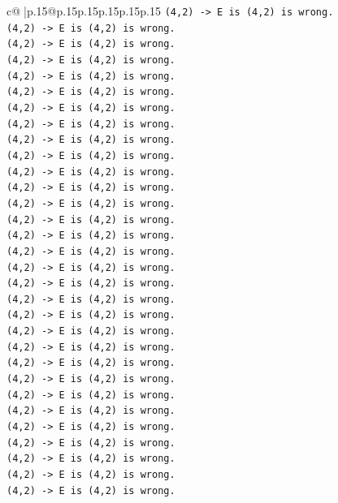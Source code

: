 \documentclass{article}
\begin{document}
{\begin{supertabular}{c@{$\;$}|p{.15\linewidth}@{}p{.15\linewidth}p{.15\linewidth}p{.15\linewidth}p{.15\linewidth}p{.15\linewidth}}
{{{\texttt{(4,2) {-}> E is (4,2) is wrong.} \\
\texttt{(4,2) {-}> E is (4,2) is wrong.} \\
\texttt{(4,2) {-}> E is (4,2) is wrong.} \\
\texttt{(4,2) {-}> E is (4,2) is wrong.} \\
\texttt{(4,2) {-}> E is (4,2) is wrong.} \\
\texttt{(4,2) {-}> E is (4,2) is wrong.} \\
\texttt{(4,2) {-}> E is (4,2) is wrong.} \\
\texttt{(4,2) {-}> E is (4,2) is wrong.} \\
\texttt{(4,2) {-}> E is (4,2) is wrong.} \\
\texttt{(4,2) {-}> E is (4,2) is wrong.} \\
\texttt{(4,2) {-}> E is (4,2) is wrong.} \\
\texttt{(4,2) {-}> E is (4,2) is wrong.} \\
\texttt{(4,2) {-}> E is (4,2) is wrong.} \\
\texttt{(4,2) {-}> E is (4,2) is wrong.} \\
\texttt{(4,2) {-}> E is (4,2) is wrong.} \\
\texttt{(4,2) {-}> E is (4,2) is wrong.} \\
\texttt{(4,2) {-}> E is (4,2) is wrong.} \\
\texttt{(4,2) {-}> E is (4,2) is wrong.} \\
\texttt{(4,2) {-}> E is (4,2) is wrong.} \\
\texttt{(4,2) {-}> E is (4,2) is wrong.} \\
\texttt{(4,2) {-}> E is (4,2) is wrong.} \\
\texttt{(4,2) {-}> E is (4,2) is wrong.} \\
\texttt{(4,2) {-}> E is (4,2) is wrong.} \\
\texttt{(4,2) {-}> E is (4,2) is wrong.} \\
\texttt{(4,2) {-}> E is (4,2) is wrong.} \\
\texttt{(4,2) {-}> E is (4,2) is wrong.} \\
\texttt{(4,2) {-}> E is (4,2) is wrong.} \\
\texttt{(4,2) {-}> E is (4,2) is wrong.} \\
\texttt{(4,2) {-}> E is (4,2) is wrong.} \\
\texttt{(4,2) {-}> E is (4,2) is wrong.} \\
\texttt{(4,2) {-}> E is (4,2) is wrong.} \\
}}}
\end{supertabular}}
\end{document}
